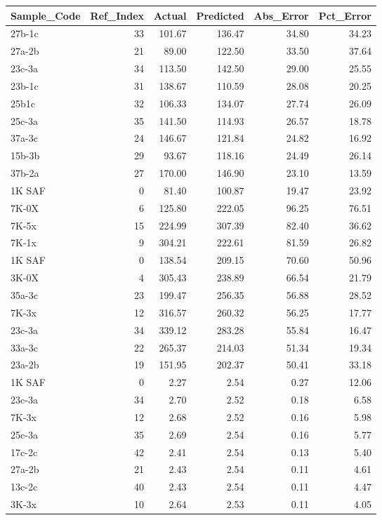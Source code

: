 \begin{tabular}{lrrrrr}
\toprule
Sample_Code & Ref_Index & Actual & Predicted & Abs_Error & Pct_Error \\
\midrule
27b-1c & 33 & 101.67 & 136.47 & 34.80 & 34.23 \\
27a-2b & 21 & 89.00 & 122.50 & 33.50 & 37.64 \\
23c-3a & 34 & 113.50 & 142.50 & 29.00 & 25.55 \\
23b-1c & 31 & 138.67 & 110.59 & 28.08 & 20.25 \\
25b1c & 32 & 106.33 & 134.07 & 27.74 & 26.09 \\
25c-3a & 35 & 141.50 & 114.93 & 26.57 & 18.78 \\
37a-3c & 24 & 146.67 & 121.84 & 24.82 & 16.92 \\
15b-3b & 29 & 93.67 & 118.16 & 24.49 & 26.14 \\
37b-2a & 27 & 170.00 & 146.90 & 23.10 & 13.59 \\
1K SAF & 0 & 81.40 & 100.87 & 19.47 & 23.92 \\
7K-0X & 6 & 125.80 & 222.05 & 96.25 & 76.51 \\
7K-5x & 15 & 224.99 & 307.39 & 82.40 & 36.62 \\
7K-1x & 9 & 304.21 & 222.61 & 81.59 & 26.82 \\
1K SAF & 0 & 138.54 & 209.15 & 70.60 & 50.96 \\
3K-0X & 4 & 305.43 & 238.89 & 66.54 & 21.79 \\
35a-3c & 23 & 199.47 & 256.35 & 56.88 & 28.52 \\
7K-3x & 12 & 316.57 & 260.32 & 56.25 & 17.77 \\
23c-3a & 34 & 339.12 & 283.28 & 55.84 & 16.47 \\
33a-3c & 22 & 265.37 & 214.03 & 51.34 & 19.34 \\
23a-2b & 19 & 151.95 & 202.37 & 50.41 & 33.18 \\
1K SAF & 0 & 2.27 & 2.54 & 0.27 & 12.06 \\
23c-3a & 34 & 2.70 & 2.52 & 0.18 & 6.58 \\
7K-3x & 12 & 2.68 & 2.52 & 0.16 & 5.98 \\
25c-3a & 35 & 2.69 & 2.54 & 0.16 & 5.77 \\
17c-2c & 42 & 2.41 & 2.54 & 0.13 & 5.40 \\
27a-2b & 21 & 2.43 & 2.54 & 0.11 & 4.61 \\
13c-2c & 40 & 2.43 & 2.54 & 0.11 & 4.47 \\
3K-3x & 10 & 2.64 & 2.53 & 0.11 & 4.05 \\

\end{tabular}
